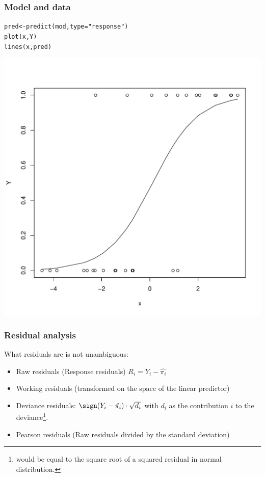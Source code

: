 \documentclass[extsize,handout,10pt]{beamer}\usepackage[]{graphicx}\usepackage[]{color}
\makeatletter
\newcommand{\hlstr}[1]{\textcolor[rgb]{1,0.4,0.2}{#1}}%
\newcommand{\hlstd}[1]{\textcolor[rgb]{0.251,0.251,0.251}{#1}}%
\newcommand{\hlkwb}[1]{\textcolor[rgb]{0,0.439,0.902}{#1}}%
\newcommand{\hlkwc}[1]{\textcolor[rgb]{0.188,0.941,0.314}{#1}}%
\newcommand{\hlkwd}[1]{\textcolor[rgb]{0.69,0.188,0.941}{#1}}%
\newenvironment{kframe}{%
 \def\at@end@of@kframe{}%
 \ifinner\ifhmode%
  \def\at@end@of@kframe{\end{minipage}}%
  \begin{minipage}{\columnwidth}%
 \fi\fi%
 \def\FrameCommand##1{\hskip\@totalleftmargin \hskip-\fboxsep
 \colorbox{shadecolor}{##1}\hskip-\fboxsep
     \hskip-\linewidth \hskip-\@totalleftmargin \hskip\columnwidth}%
 \MakeFramed {\advance\hsize-\width
   \@totalleftmargin\z@ \linewidth\hsize
   \@setminipage}}%
 {\par\unskip\endMakeFramed%
 \at@end@of@kframe}
\newenvironment{knitrout}{}{} %
\makeatother
\begin{document}
\begin{frame}[fragile]
  \frametitle{Model and data} 

\begin{knitrout}\tiny
{}\color{fgcolor}\begin{kframe}
\begin{alltt}
\hlstd{pred}\hlkwb{<-}\hlkwd{predict}\hlstd{(mod,}\hlkwc{type}\hlstd{=}\hlstr{"response"}\hlstd{)}
\hlkwd{plot}\hlstd{(x,Y)}
\hlkwd{lines}\hlstd{(x,pred)}
\end{alltt}
\end{kframe}

{\centering \includegraphics[width=.49\linewidth]{figures/GesWiss2unnamed-chunk-11-1} 

}



\end{knitrout}
 

\end{frame}




\begin{frame}[fragile]
  \frametitle{Residual analysis} 
What residuals are is not unambiguous:
  \begin{itemize}
  \item Raw residuals (Response residuals) $R_i=Y_i-\hat{\pi_i}$
  \item Working residuals (transformed on the space of the linear predictor)
  \item Deviance residuals: $\sign(Y_i-\hat{\pi_i})\cdot\sqrt{d_i}$ with
    $d_i$ as the contribution $i$ to the deviance\footnote{would be equal to the square root of
    a squared residual in normal distribution.}.
  \item Pearson residuals (Raw residuals divided by the standard
    deviation)
  \end{itemize}
 

\end{frame}
\end{document}
